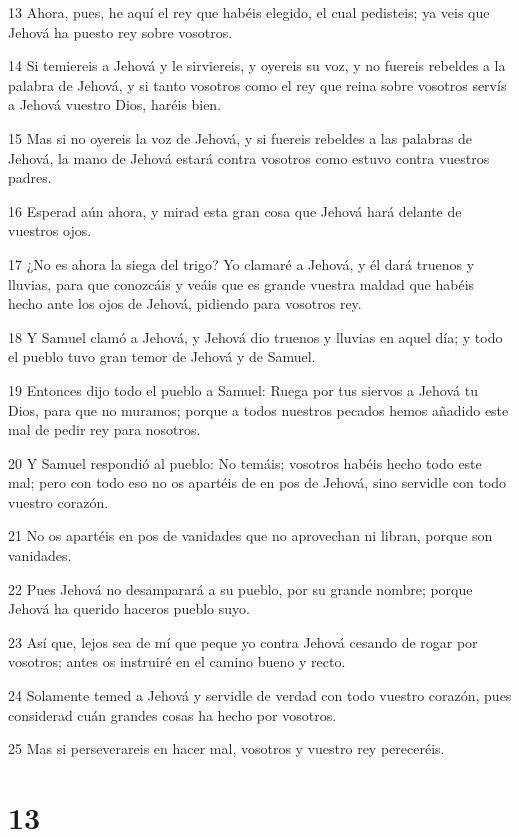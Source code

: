 \par 13 Ahora, pues, he aquí el rey que habéis elegido, el cual pedisteis; ya veis que Jehová ha puesto rey sobre vosotros.
\par 14 Si temiereis a Jehová y le sirviereis, y oyereis su voz, y no fuereis rebeldes a la palabra de Jehová, y si tanto vosotros como el rey que reina sobre vosotros servís a Jehová vuestro Dios, haréis bien.
\par 15 Mas si no oyereis la voz de Jehová, y si fuereis rebeldes a las palabras de Jehová, la mano de Jehová estará contra vosotros como estuvo contra vuestros padres.
\par 16 Esperad aún ahora, y mirad esta gran cosa que Jehová hará delante de vuestros ojos.
\par 17 ¿No es ahora la siega del trigo? Yo clamaré a Jehová, y él dará truenos y lluvias, para que conozcáis y veáis que es grande vuestra maldad que habéis hecho ante los ojos de Jehová, pidiendo para vosotros rey.
\par 18 Y Samuel clamó a Jehová, y Jehová dio truenos y lluvias en aquel día; y todo el pueblo tuvo gran temor de Jehová y de Samuel.
\par 19 Entonces dijo todo el pueblo a Samuel: Ruega por tus siervos a Jehová tu Dios, para que no muramos; porque a todos nuestros pecados hemos añadido este mal de pedir rey para nosotros.
\par 20 Y Samuel respondió al pueblo: No temáis; vosotros habéis hecho todo este mal; pero con todo eso no os apartéis de en pos de Jehová, sino servidle con todo vuestro corazón.
\par 21 No os apartéis en pos de vanidades que no aprovechan ni libran, porque son vanidades.
\par 22 Pues Jehová no desamparará a su pueblo, por su grande nombre; porque Jehová ha querido haceros pueblo suyo.
\par 23 Así que, lejos sea de mí que peque yo contra Jehová cesando de rogar por vosotros; antes os instruiré en el camino bueno y recto.
\par 24 Solamente temed a Jehová y servidle de verdad con todo vuestro corazón, pues considerad cuán grandes cosas ha hecho por vosotros.
\par 25 Mas si perseverareis en hacer mal, vosotros y vuestro rey pereceréis.

\chapter{13}

